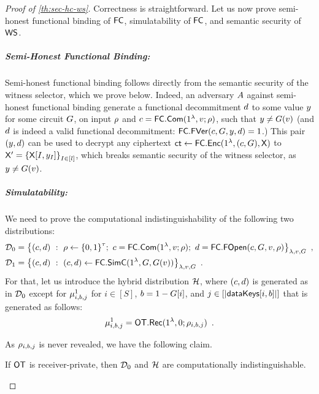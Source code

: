 
\begin{proof}[Proof of \cref{th:sec-hc-ws}]
  Correctness is straightforward. Let us now prove semi-honest functional binding of $\mathsf{FC}$, simulatability of $\mathsf{FC}$, and semantic security of $\mathsf{WS}$.
  
  \subparagraph{Semi-Honest Functional Binding:}
  Semi-honest functional binding follows directly from the semantic security of the witness selector, which we prove below.
  Indeed, an adversary $A$ against semi-honest functional binding generate a functional decommitment $d$ to some value $y$  for some circuit $G$, on input $\rho$ and $c = \mathsf{FC.Com}(1^\lambda,v;\rho)$, such that $y \neq G(v)$ (and $d$ is indeed a valid functional decommitment: $\mathsf{FC.FVer}(c,G,y,d)=1$.)
  This pair $(y,d)$ can be used to decrypt any ciphertext $\mathsf{ct} \gets \mathsf{\mathsf{FC}.Enc}(1^\lambda, (c,G), \mathsf{X})$ to $\mathsf{X}' = {\{\mathsf{X}[I,y_I]\}}_{I \in [l]}$, which breaks semantic security of the witness selector, as $y \neq G(v)$.
  
  \subparagraph{Simulatability:} We need to prove the computational indistinguishability of the following two distributions:
  \begin{align*}
    \distr_0 &= {\left\{
               (\hcc,\hcd)
               \ : \
               \hcr \getsr \bits^\hcrlen; \ \hcc =
               \hccom(1^\secpar,\hcmsg;\hcr); \ \hcd = \hcopen(\hcc, \hccir, \hcmsg,
               \hcr) 
               \right\}}_{\secpar,\hcmsg,\hccir}\enspace, \\
    \distr_1 &= {\left\{  (\hcc,\hcd)
               \ : \ 
               (\hcc, \hcd) \getsr
               \hcsim(1^\secpar, \hccir, \hccir(\hcmsg))
               \right\}}_{\secpar,\hcmsg,\hccir}\enspace.
  \end{align*}
  For that, let us introduce the hybrid distribution $\mathcal{H}$, where $(c,d)$ is generated as in $\mathcal{D}_0$ except for $\mu^1_{i,b,j}$ for $i \in [S]$, $b = 1-G[i]$, and $j \in [|\mathsf{dataKeys}[i,b]|]$ that is generated as follows:
  \[ \mu^1_{i,b,j} = \mathsf{OT.Rec}(1^\lambda,0;\rho_{i,b,j})\enspace.  \]

  As $\rho_{i,b,j}$ is never revealed, we have the following claim.
  \begin{claim}
    If $\mathsf{OT}$ is receiver-private, then $\mathcal{D}_0$ and $\mathcal{H}$ are computationally indistinguishable.
  \end{claim}


\end{proof}
